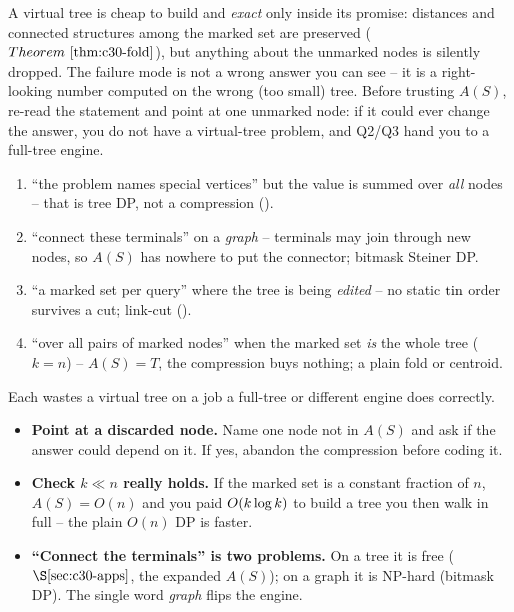 \begin{insightbox}
A virtual tree is cheap to build and \emph{exact} only inside its promise: distances and
connected structures among the marked set are preserved (\(\thmref{c30-fold}\)), but
anything about the unmarked nodes is silently dropped.  The failure mode is not a wrong
answer you can see -- it is a right-looking number computed on the wrong (too small)
tree.  Before trusting \(A(S)\), re-read the statement and point at one unmarked node:
if it could ever change the answer, you do not have a virtual-tree problem, and Q2/Q3
hand you to a full-tree engine.
\end{insightbox}

\begin{warningbox}
\begin{enumerate}[nosep,leftmargin=1.6em]
  \item ``the problem names special vertices'' but the value is summed over \emph{all}
        nodes -- that is tree DP, not a compression ().
  \item ``connect these terminals'' on a \emph{graph} -- terminals may join through new
        nodes, so \(A(S)\) has nowhere to put the connector; bitmask Steiner DP.
  \item ``a marked set per query'' where the tree is being \emph{edited} -- no static
        \(\operatorname{tin}\) order survives a cut; link-cut ().
  \item ``over all pairs of marked nodes'' when the marked set \emph{is} the whole tree
        (\(k=n\)) -- \(A(S)=T\), the compression buys nothing; a plain fold or centroid.
\end{enumerate}
Each wastes a virtual tree on a job a full-tree or different engine does correctly.
\end{warningbox}

\begin{hardeningbox}
\begin{itemize}[nosep,leftmargin=1.4em]
  \item \textbf{Point at a discarded node.} Name one node not in \(A(S)\) and ask if the
        answer could depend on it. If yes, abandon the compression before coding it.
  \item \textbf{Check \(k\ll n\) really holds.} If the marked set is a constant fraction
        of \(n\), \(A(S)=O(n)\) and you paid \(O(k\log k)\) to build a tree you then
        walk in full -- the plain \(O(n)\) DP is faster.
  \item \textbf{``Connect the terminals'' is two problems.} On a tree it is free
        (\(\secref{c30-apps}\), the expanded \(A(S)\)); on a graph it is NP-hard (bitmask
        DP).  The single word \emph{graph} flips the engine.
\end{itemize}
\end{hardeningbox}

